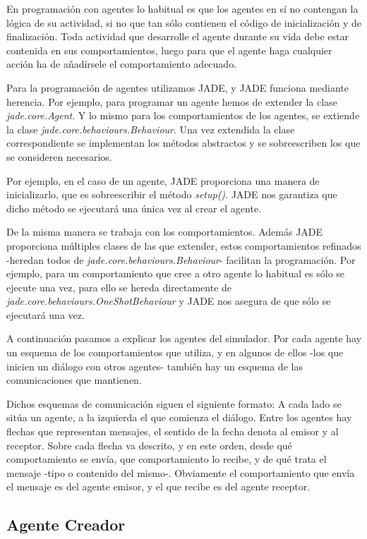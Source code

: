 En programación con agentes lo habitual es que los agentes en sí no contengan
la lógica de su actividad, si no que tan sólo contienen el código de
inicialización y de finalización. Toda actividad que desarrolle el agente
durante su vida debe estar contenida en sus comportamientos, luego para que el
agente haga cualquier acción ha de añadírsele el comportamiento adecuado.

Para la programación de agentes utilizamos JADE, y JADE funciona mediante
herencia. Por ejemplo, para programar un agente hemos de extender la clase {\em
jade.core.Agent}. Y lo mismo para los comportamientos de los agentes, se
extiende la clase {\em jade.core.behaviours.Behaviour}. Una vez extendida la
clase correspondiente se implementan los métodos abstractos y se sobreescriben
los que se consideren necesarios.

Por ejemplo, en el caso de un agente, JADE proporciona una manera de
inicializarlo, que es sobreescribir el método {\em setup()}. JADE nos garantiza
que dicho método se ejecutará una única vez al crear el agente.

De la misma manera se trabaja con los comportamientos. Además JADE proporciona
múltiples clases de las que extender, estos comportamientos refinados -heredan
todos de {\em jade.core.behaviours.Behaviour}- facilitan la programación. Por
ejemplo, para un comportamiento que cree a otro agente lo habitual es sólo se
ejecute una vez, para ello se hereda directamente de {\em
jade.core.behaviours.OneShotBehaviour} y JADE nos asegura de que sólo se
ejecutará una vez.

A continuación pasamos a explicar los agentes del simulador. Por cada agente
hay un esquema de los comportamientos que utiliza, y en algunos de ellos -los
que inicien un diálogo con otros agentes- también hay un esquema de las
comunicaciones que mantienen.

Dichos esquemas de comunicación siguen el siguiente formato: A cada lado se
sitúa un agente, a la izquierda el que comienza el diálogo. Entre los agentes
hay flechas que representan mensajes, el sentido de la fecha denota al emisor y
al receptor. Sobre cada flecha va descrito, y en este orden, desde qué
comportamiento se envía, que comportamiento lo recibe, y de qué trata el
mensaje -tipo o contenido del mismo-. Obviamente el comportamiento que envía el
mensaje es del agente emisor, y el que recibe es del agente receptor.

\subsection*{Agente Creador}

